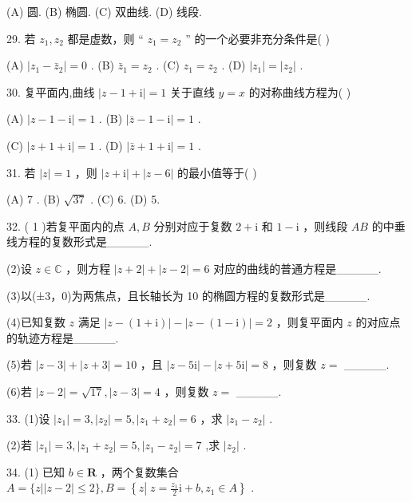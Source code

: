 \documentclass[10pt]{article}
\begin{document}
(A) 圆. (B) 椭圆. (C) 双曲线. (D) 线段.

29. 若 \({z}_{1},{z}_{2}\) 都是虚数，则 “ \({z}_{1} = {z}_{2}\) ” 的一个必要非充分条件是( )

(A) \(\left| {{z}_{1} - {\bar{z}}_{2}}\right|  = 0\) . (B) \({\bar{z}}_{1} = {z}_{2}\) . (C) \({z}_{1} = {z}_{2}\) . (D) \(\left| {z}_{1}\right|  = \left| {z}_{2}\right|\) .

30. 复平面内,曲线 \(\left| {z - 1 + \mathrm{i}}\right|  = 1\) 关于直线 \(y = x\) 的对称曲线方程为( )

(A) \(\left| {z - 1 - \mathrm{i}}\right|  = 1\) . (B) \(\left| {\bar{z} - 1 - \mathrm{i}}\right|  = 1\) .

(C) \(\left| {z + 1 + \mathrm{i}}\right|  = 1\) . (D) \(\left| {\bar{z} + 1 + \mathrm{i}}\right|  = 1\) .

31. 若 \(\left| z\right|  = 1\) ，则 \(\left| {z + \mathrm{i}}\right|  + \left| {z - 6}\right|\) 的最小值等于( )

(A) 7 . (B) \(\sqrt{37}\) . (C) 6. (D) 5.

32. ( 1 )若复平面内的点 \(A,B\) 分别对应于复数 \(2 + \mathrm{i}\) 和 \(1 - \mathrm{i}\) ，则线段 \({AB}\) 的中垂线方程的复数形式是\_\_\_\_\_.

(2)设 \(z \in  \mathbb{C}\) ，则方程 \(\left| {z + 2}\right|  + \left| {z - 2}\right|  = 6\) 对应的曲线的普通方程是\_\_\_\_\_.

(3)以(±3，0)为两焦点，且长轴长为 10 的椭圆方程的复数形式是\_\_\_\_\_.

(4)已知复数 \(z\) 满足 \(\left| {z - \left( {1 + \mathrm{i}}\right) }\right|  - \left| {z - \left( {1 - \mathrm{i}}\right) }\right|  = 2\) ，则复平面内 \(z\) 的对应点的轨迹方程是\_\_\_\_\_.

(5)若 \(\left| {z - 3}\right|  + \left| {z + 3}\right|  = {10}\) ，且 \(\left| {z - 5\mathrm{i}}\right|  - \left| {z + 5\mathrm{i}}\right|  = 8\) ，则复数 \(z =\) \_\_\_\_\_.

(6)若 \(\left| {z - 2}\right|  = \sqrt{17},\left| {z - 3}\right|  = 4\) ，则复数 \(z =\) \_\_\_\_\_.

33. (1)设 \(\left| {z}_{1}\right|  = 3,\left| {z}_{2}\right|  = 5,\left| {{z}_{1} + {z}_{2}}\right|  = 6\) ，求 \(\left| {{z}_{1} - {z}_{2}}\right|\) .

(2)若 \(\left| {z}_{1}\right|  = 3,\left| {{z}_{1} + {z}_{2}}\right|  = 5,\left| {{z}_{1} - {z}_{2}}\right|  = 7\) ,求 \(\left| {z}_{2}\right|\) .

34. (1) 已知 \(b \in  \mathbf{R}\) ，两个复数集合 \(A = \{ z\left| \right| z - 2 \mid   \leq  2\} ,B = \left\{  {z\left| {\;z = \frac{{z}_{1}}{2}\mathrm{i} + b}\right. ,{z}_{1} \in  A}\right\}\) .
\end{document}
